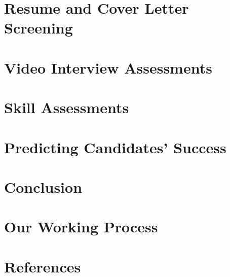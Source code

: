 \documentclass[
]{book}
\begin{document}
\hypertarget{resume-and-cover-letter-screening}{%
\chapter{Resume and Cover Letter Screening}\label{resume-and-cover-letter-screening}}

\hypertarget{video-interview-assessments}{%
\chapter{Video Interview Assessments}\label{video-interview-assessments}}

\hypertarget{skill-assessments}{%
\chapter{Skill Assessments}\label{skill-assessments}}

\hypertarget{predicting-candidates-success}{%
\chapter{Predicting Candidates' Success}\label{predicting-candidates-success}}

\hypertarget{conclusion}{%
\chapter{Conclusion}\label{conclusion}}

\hypertarget{our-working-process}{%
\chapter{Our Working Process}\label{our-working-process}}

\hypertarget{references}{%
\chapter{References}\label{references}}

  
\end{document}
